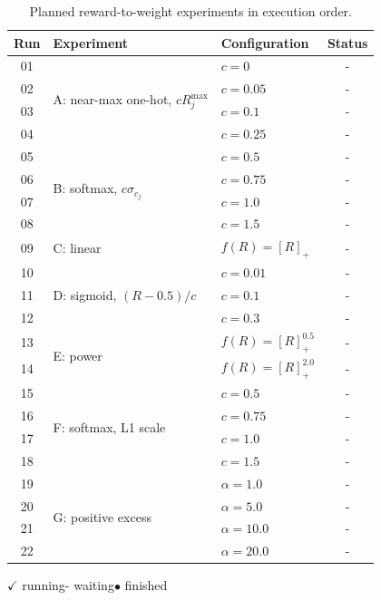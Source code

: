 \documentclass{article} %
\begin{document}

\begin{table}[H]
    \centering
    \caption{Planned reward-to-weight experiments in execution order.}
    \label{tab:weight-variant-planned-sweep}
    \footnotesize
    \setlength{\tabcolsep}{5pt}
    \renewcommand{\arraystretch}{0.95}
    \begin{tabular}{@{}c l l c@{}}
        \toprule
        Run & Experiment & Configuration & Status \\
        \midrule
        01 & \multirow{4}{*}{A: near-max one-hot, $cR_j^{\max}$} & $c=0$  & - \\
        02 & & $c=0.05$ & - \\
        03 & & $c=0.1$ & - \\
        04 & & $c=0.25$ & - \\
        \midrule
        05 & \multirow{4}{*}{B: softmax, $c\sigma_{c_j}$} & $c=0.5$ & - \\
        06 & & $c=0.75$ & - \\
        07 & & $c=1.0$ & - \\
        08 & & $c=1.5$ & - \\
        \midrule
        09 & C: linear & $f(R)=[R]_+$ & - \\
        \midrule
        10 & \multirow{3}{*}{D: sigmoid, $(R-0.5)/c$} & $c=0.01$ & - \\
        11 & & $c=0.1$ & - \\
        12 & & $c=0.3$ & - \\
        \midrule
        13 & \multirow{2}{*}{E: power} & $f(R)=[R]_+^{0.5}$ & - \\
        14 & & $f(R)=[R]_+^{2.0}$ & - \\
        \midrule
        15 & \multirow{4}{*}{F: softmax, L1 scale} & $c=0.5$ & - \\
        16 & & $c=0.75$ & - \\
        17 & & $c=1.0$ & - \\
        18 & & $c=1.5$ & - \\
        \midrule
        19 & \multirow{4}{*}{G: positive excess} & $\alpha=1.0$ & - \\
        20 & & $\alpha=5.0$ & - \\
        21 & & $\alpha=10.0$ & - \\
        22 & & $\alpha=20.0$ & - \\
        \bottomrule
    \end{tabular}

    \vspace{0.3em}
    \scriptsize
    $\checkmark$ running\qquad - waiting\qquad $\bullet$ finished
\end{table}
\end{document}
